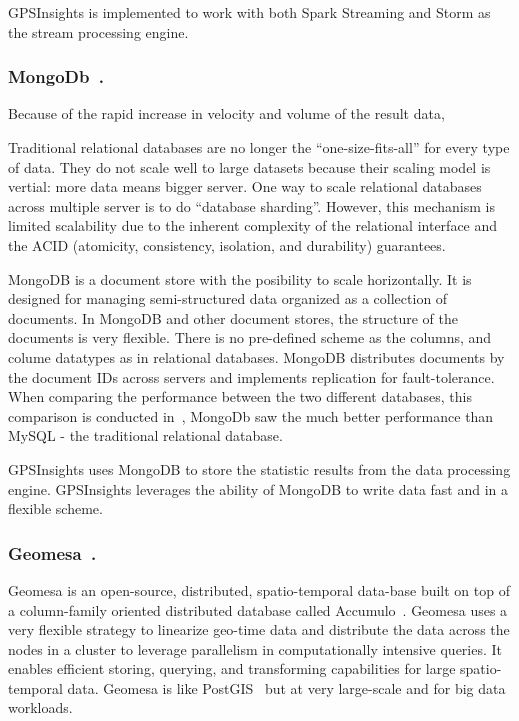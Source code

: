 \documentclass{acm_proc_article-sp}
\begin{document}
GPSInsights is implemented to work with both Spark Streaming and Storm as the stream processing engine.


\subsubsection{MongoDb~\cite{mongodbweb}.}


Because of the rapid increase in velocity and volume of the result data, 

Traditional relational databases are no longer the ``one-size-fits-all'' for every type of data. They do not scale well to large datasets because their scaling model is vertial: more data means bigger server. One way to scale relational databases across multiple server is to do ``database sharding''. However, this mechanism is limited scalability due to the inherent complexity of the relational interface and the ACID (atomicity, consistency, isolation, and durability) guarantees. 

MongoDB is a document store with the posibility to scale horizontally. It is designed for managing semi-structured data organized as a collection of documents. In MongoDB and other document stores, the structure of the documents is very flexible. There is no pre-defined scheme as the columns, and colume datatypes as in relational databases. MongoDB distributes documents by the document IDs across servers and implements replication for fault-tolerance. When comparing the performance between the two different databases, this comparison is conducted in~\cite{10.11648/j.ajsea.20150402.12}, MongoDb saw the much better performance than MySQL - the traditional relational database.

GPSInsights uses MongoDB to store the statistic results from the data processing engine. GPSInsights leverages the ability of MongoDB to write data fast and in a flexible scheme. 

\subsubsection{Geomesa~\cite{fox2013spatio}.}
 
Geomesa is an open-source, distributed, spatio-temporal data-base built on top of a column-family oriented distributed database called Accumulo~\cite{accumuloonline}. Geomesa uses a very flexible strategy to linearize geo-time data and distribute the data across the nodes in a cluster to leverage parallelism in computationally intensive queries. It enables efficient storing, querying, and transforming capabilities for large spatio-temporal data. Geomesa is like PostGIS~\cite{posgis} but at very large-scale and for big data workloads. 
\end{document}
